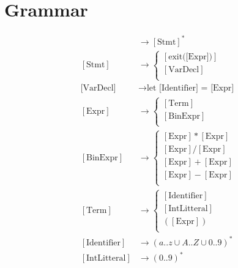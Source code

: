 \documentclass[12pt]{article}
\begin{document}
\section*{Grammar}

\begin{align}
    [\text{Program}] &\to [\text{Stmt}]^* \\
    [\text{Stmt}] &\to 
        \begin{cases}
            [\text{exit([Expr])}] \\
            [\text{VarDecl}] \\
        \end{cases} \\
    \text{[VarDecl]} &\to \text{let [Identifier] = [Expr]} \\
    [\text{Expr}] &\to 
        \begin{cases}
            [\text{Term}] \\
            [\text{BinExpr}] \\
        \end{cases} \\
    [\text{BinExpr}] &\to 
        \begin{cases}
            [\text{Expr}] * [\text{Expr}] \\
            [\text{Expr}] / [\text{Expr}] \\
            [\text{Expr}] + [\text{Expr}] \\
            [\text{Expr}] - [\text{Expr}] \\
        \end{cases} \\
    [\text{Term}] &\to 
        \begin{cases}
            [\text{Identifier}] \\
            [\text{IntLitteral}] \\
            ([\text{Expr}]) \\
        \end{cases} \\
    [\text{Identifier}] &\to (a..z \cup A..Z \cup 0..9)^* \\
    [\text{IntLitteral}] &\to (0..9)^* \\
\end{align}
\end{document}
